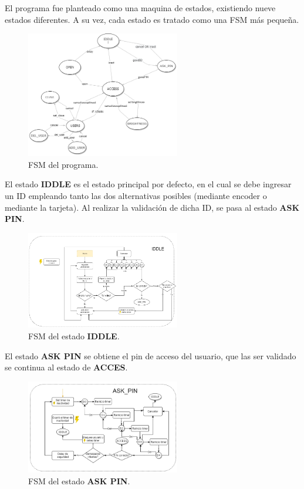 El programa fue planteado como una maquina de estados, existiendo nueve estados diferentes. A su vez, cada estado es tratado como una FSM más pequeña.

\begin{figure}[H]
\centering
	\includegraphics[width=0.6\textwidth]{ImagenesEjercicio2/fsm.png}
	\caption{FSM del programa.}
	\label{fig:fsm}
\end{figure}

El estado \textbf{IDDLE} es el estado principal por defecto, en el cual se debe ingresar un ID empleando tanto las dos alternativas posibles (mediante encoder o mediante la tarjeta). Al realizar la validación de dicha ID, se pasa al estado \textbf{ASK PIN}.

\begin{figure}[H]
\centering
	\includegraphics[width=0.6\textwidth]{ImagenesEjercicio2/iddle.png}
	\caption{FSM del estado \textbf{IDDLE}.}
	\label{fig:iddle}
\end{figure}

El estado \textbf{ASK PIN} se obtiene el pin de acceso del usuario, que las ser validado se continua al estado de \textbf{ACCES}.

\begin{figure}[H]
\centering
	\includegraphics[width=0.6\textwidth]{ImagenesEjercicio2/askpin.png}
	\caption{FSM del estado \textbf{ASK PIN}.}
	\label{fig:askpin}
\end{figure}

